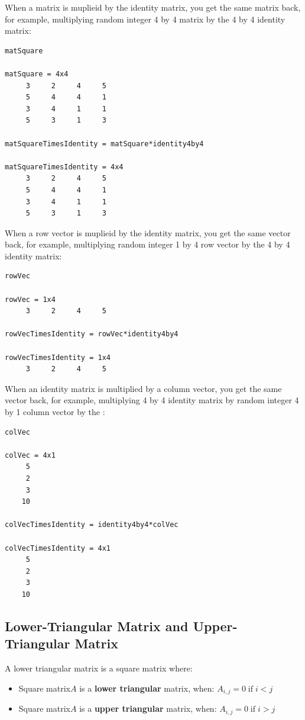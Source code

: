 \documentclass[
]{book}
\begin{document}
When a matrix is muplieid by the identity matrix, you get the same
matrix back, for example, multiplying random integer 4 by 4 matrix by
the 4 by 4 identity matrix:

\begin{verbatim}
matSquare

matSquare = 4x4    
     3     2     4     5
     5     4     4     1
     3     4     1     1
     5     3     1     3

matSquareTimesIdentity = matSquare*identity4by4

matSquareTimesIdentity = 4x4    
     3     2     4     5
     5     4     4     1
     3     4     1     1
     5     3     1     3
\end{verbatim}

When a row vector is muplieid by the identity matrix, you get the same
vector back, for example, multiplying random integer 1 by 4 row vector
by the 4 by 4 identity matrix:

\begin{verbatim}
rowVec

rowVec = 1x4    
     3     2     4     5

rowVecTimesIdentity = rowVec*identity4by4

rowVecTimesIdentity = 1x4    
     3     2     4     5
\end{verbatim}

When an identity matrix is multiplied by a column vector, you get the
same vector back, for example, multiplying 4 by 4 identity matrix by
random integer 4 by 1 column vector by the :

\begin{verbatim}
colVec

colVec = 4x1    
     5
     2
     3
    10

colVecTimesIdentity = identity4by4*colVec

colVecTimesIdentity = 4x1    
     5
     2
     3
    10
\end{verbatim}

\hypertarget{lower-triangular-matrix-and-upper-triangular-matrix}{%
\subsection{Lower-Triangular Matrix and Upper-Triangular Matrix}\label{lower-triangular-matrix-and-upper-triangular-matrix}}

A lower triangular matrix is a square matrix where:

\begin{itemize}
\item
  Square matrix\(A\) is a \textbf{lower triangular} matrix, when:
  \(A_{i,j} =0\;\textrm{if}\;i<j\)
\item
  Square matrix\(A\) is a \textbf{upper triangular} matrix, when:
  \(A_{i,j} =0\;\textrm{if}\;i>j\)
\end{itemize}
\end{document}
